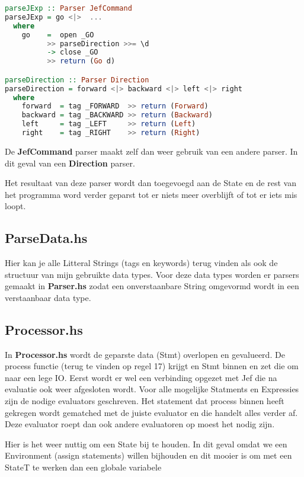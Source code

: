 \documentclass[]{article}
\begin{document}
\begin{lstlisting}[language=Haskell]
parseJExp :: Parser JefCommand
parseJExp = go <|>  ...
  where
    go    =  open _GO
          >> parseDirection >>= \d
          -> close _GO
          >> return (Go d)

parseDirection :: Parser Direction
parseDirection = forward <|> backward <|> left <|> right
  where
    forward  = tag _FORWARD  >> return (Forward)
    backward = tag _BACKWARD >> return (Backward)
    left     = tag _LEFT     >> return (Left)
    right    = tag _RIGHT    >> return (Right)
\end{lstlisting}

De \textbf{JefCommand} parser maakt zelf dan weer gebruik van een andere parser. In dit geval van een \textbf{Direction} parser. 

Het resultaat van deze parser wordt dan toegevoegd aan de State en de rest van het programma word verder geparst tot er niets meer overblijft of tot er iets mis loopt.

\-
\newpage
\subsection{ParseData.hs}
Hier kan je alle Litteral Strings (tags en keywords) terug vinden als ook de structuur van mijn gebruikte data types. 
Voor deze data types worden er parsers gemaakt in \textbf{Parser.hs} zodat een onverstaanbare String omgevormd wordt in een verstaanbaar data type. 

\subsection{Processor.hs}
In \textbf{Processor.hs} wordt de geparste data (Stmt) overlopen en gevalueerd. De process functie (terug te vinden op regel 17) krijgt en Stmt binnen en zet die om naar een lege IO. Eerst wordt er wel een verbinding opgezet met Jef die na evaluatie ook weer afgesloten wordt. 
Voor alle mogelijke Statments en Expressies zijn de nodige evaluators geschreven. Het statement dat process binnen heeft gekregen wordt gematched met de juiste evaluator en die handelt alles verder af. Deze evaluator roept dan ook andere evaluatoren op moest het nodig zijn. 

\-

Hier is het weer nuttig om een State bij te houden. In dit geval omdat we een Environment (assign statements) willen bijhouden en dit mooier is om met een StateT te werken dan een globale variabele 
\end{document}
